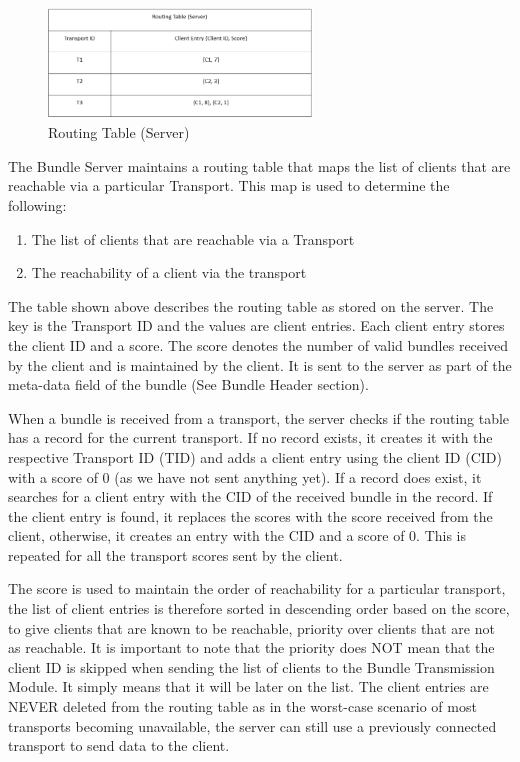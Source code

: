 \begin{figure}[ht!]
\centering
\includegraphics[width= 70mm]{./images/Routing Table.png}
\caption{Routing Table (Server)}
\end{figure}

The Bundle Server maintains a routing table that maps the list of clients that are reachable via a particular Transport. This map is used to determine the following:
\begin{enumerate} [label=(\alph*)]
    \item The list of clients that are reachable via a Transport
    \item The reachability of a client via the transport	
\end{enumerate}

The table shown above describes the routing table as stored on the server. The key is the Transport ID and the values are client entries. Each client entry stores the client ID and a score. The score denotes the number of valid bundles received by the client and is maintained by the client. It is sent to the server as part of the meta-data field of the bundle (See Bundle Header section).

When a bundle is received from a transport, the server checks if the routing table has a record for the current transport. If no record exists, it creates it with the respective Transport ID (TID) and adds a client entry using the client ID (CID) with a score of 0 (as we have not sent anything yet). If a record does exist, it searches for a client entry with the CID of the received bundle in the record. If the client entry is found, it replaces the scores with the score received from the client, otherwise, it creates an entry with the CID and a score of 0. This is repeated for all the transport scores sent by the client.

The score is used to maintain the order of reachability for a particular transport, the list of client entries is therefore sorted in descending order based on the score, to give clients that are known to be reachable, priority over clients that are not as reachable. It is important to note that the priority does NOT mean that the client ID is skipped when sending the list of clients to the Bundle Transmission Module. It simply means that it will be later on the list.
The client entries are NEVER deleted from the routing table as in the worst-case scenario of most transports becoming unavailable, the server can still use a previously connected transport to send data to the client.

